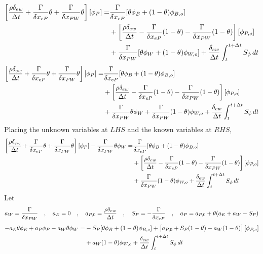 \documentclass[class=report, 12pt, crop=false]{standalone}
\begin{document}
\begin{center}
\begin{equation*}
\begin{split}
\left[\frac{\rho\delta_{ew}}{\Delta t} + \frac{\Gamma}{\delta x_{eP}}\theta + \frac{\Gamma}{\delta x_{PW}}\theta\right][\phi_{P}] = & \frac{\Gamma }{\delta x_{eP}}[\theta\phi_{B} + (1-\theta)\phi_{B,o}]\\ & +\left[\frac{\rho\delta_{ew}}{\Delta t} - \frac{\Gamma }{\delta x_{eP}}(1-\theta) - \frac{\Gamma }{\delta x_{PW}}(1-\theta)\right][\phi_{P,o}] \\ &  + \frac{\Gamma }{\delta x_{PW}}[\theta\phi_{W} + (1-\theta)\phi_{W,o}] + \frac{\delta_{ew}}{\Delta t}\int^{t+\Delta t}_{t} S_\phi\,dt 
\end{split}
\end{equation*}
\begin{equation*}
\begin{split}
\left[\frac{\rho\delta_{ew}}{\Delta t} + \frac{\Gamma}{\delta x_{eP}}\theta + \frac{\Gamma}{\delta x_{PW}}\theta\right][\phi_{P}] = & \frac{\Gamma }{\delta x_{eP}}[\theta\phi_{B} + (1-\theta)\phi_{B,o}]\\ & +\left[\frac{\rho\delta_{ew}}{\Delta t} - \frac{\Gamma }{\delta x_{eP}}(1-\theta) - \frac{\Gamma }{\delta x_{PW}}(1-\theta)\right][\phi_{P,o}] \\ &  + \frac{\Gamma }{\delta x_{PW}}\theta\phi_{W} + \frac{\Gamma }{\delta x_{PW}}(1-\theta)\phi_{W,o} + \frac{\delta_{ew}}{\Delta t}\int^{t+\Delta t}_{t} S_\phi\,dt 
\end{split}
\end{equation*}
Placing the unknown variables at $LHS$ and the known variables at $RHS$,
\begin{equation*}
\begin{split}
\left[\frac{\rho\delta_{ew}}{\Delta t} + \frac{\Gamma}{\delta x_{eP}}\theta + \frac{\Gamma}{\delta x_{PW}}\theta\right][\phi_{P}]  - \frac{\Gamma }{\delta x_{PW}}\theta\phi_{W} = & \frac{\Gamma }{\delta x_{eP}}[\theta\phi_{B} + (1-\theta)\phi_{B,o}]\\ & +\left[\frac{\rho\delta_{ew}}{\Delta t} - \frac{\Gamma }{\delta x_{eP}}(1-\theta) - \frac{\Gamma }{\delta x_{PW}}(1-\theta)\right][\phi_{P,o}] \\ &  + \frac{\Gamma }{\delta x_{PW}}(1-\theta)\phi_{W,o} + \frac{\delta_{ew}}{\Delta t}\int^{t+\Delta t}_{t} S_\phi\,dt 
\end{split}
\end{equation*}
Let
$$a_W = \frac{\Gamma }{\delta x_{PW}} \quad,\quad a_E = 0 \quad,\quad a_{P,0} = \frac{\rho\delta_{ew}}{\Delta t} \quad,\quad S_P = -\frac{\Gamma}{\delta x_{eP}} \quad,\quad a_{P} = a_{P,0} + \theta(a_E + a_W - S_P)$$
\begin{equation*}
\begin{split}
-a_E\theta\phi_E + a_{P}\phi_{P}  - a_W\theta\phi_{W} = & -S_P[\theta\phi_{B} + (1-\theta)\phi_{B,o}] + \left[a_{P,0} + S_P(1-\theta) - a_W(1-\theta)\right][\phi_{P,o}] \\ &  + a_W(1-\theta)\phi_{W,o} + \frac{\delta_{ew}}{\Delta t}\int^{t+\Delta t}_{t} S_\phi\,dt 
\end{split}
\end{equation*}

\end{center}
\end{document}
